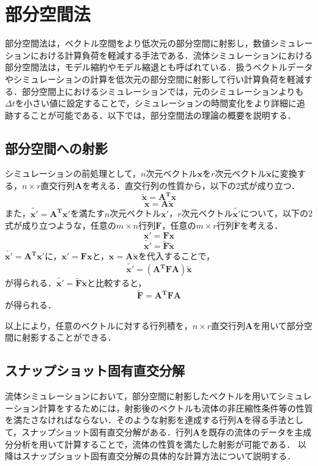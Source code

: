 \documentclass[a4j,12pt]{jreport}
\begin{document}
\section{部分空間法}\label{sec:Subspace}
部分空間法は，ベクトル空間をより低次元の部分空間に射影し，数値シミュレーションにおける計算負荷を軽減する手法である．流体シミュレーションにおける部分空間法は，モデル縮約やモデル縮退とも呼ばれている．扱うベクトルデータやシミュレーションの計算を低次元の部分空間に射影して行い計算負荷を軽減する．部分空間上におけるシミュレーションでは，元のシミュレーションよりも$\varDelta t$を小さい値に設定することで，シミュレーションの時間変化をより詳細に追跡することが可能である．以下では，部分空間法の理論の概要を説明する．

\subsection{部分空間への射影}
シミュレーションの前処理として，$n$次元ベクトル$\bm{x}$を$r$次元ベクトル$\bm{\tilde{x}} $に変換する，$n \times r$直交行列$\bm{A}$を考える．直交行列の性質から，以下の2式が成り立つ．
 	\[
 		\bm{\tilde{x}}  = \bm{A^T}\bm{x}
 	\]
	\[
		\bm{x} = \bm{A}\bm{\tilde{x}} 
	\]	
	また，$\bm{\tilde{x'}}  = \bm{A^T}\bm{x'}$を満たす$n$次元ベクトル$\bm{x'}$，$r$次元ベクトル$\bm{\tilde{x'}} $について，以下の2式が成り立つような，任意の$m \times n$行列$\bm{F}$，任意の$m \times r$行列$\bm{\tilde{F}}$を考える．
	\[
		\bm{x'} = \bm{F}\bm{x}
	\]
	\[
		\bm{\tilde{x'}}  = \bm{\tilde{F}}\bm{\tilde{x}} 
	\]
$\bm{\tilde{x'}}  = \bm{A^T}\bm{x'}$に，$\bm{x'} = \bm{F}\bm{x}$と，$\bm{x} = \bm{A}\bm{\tilde{x}} $を代入することで，
	\[
		\bm{\tilde{x'}}  = (\bm{A^T}\bm{F}\bm{A})\bm{\tilde{x}} 
	\]
	が得られる．$\bm{\tilde{x'}}  = \bm{\tilde{F}}\bm{\tilde{x}} $と比較すると，
	\[
	\bm{\tilde{F}} = \bm{A^T}\bm{F}\bm{A}
	\]
	が得られる．
	
以上により，任意のベクトルに対する行列積を，$n \times r$直交行列$\bm{A}$を用いて部分空間に射影することができる．

\subsection{スナップショット固有直交分解}
流体シミュレーションにおいて，部分空間に射影したベクトルを用いてシミュレーション計算をするためには，射影後のベクトルも流体の非圧縮性条件等の性質を満たさなければならない．そのような射影を達成する行列$\bm{A}$を得る手法として，スナップショット固有直交分解がある．行列$\bm{A}$を既存の流体のデータを主成分分析を用いて計算することで，流体の性質を満たした射影が可能である．
以降はスナップショット固有直交分解の具体的な計算方法について説明する．
	
\end{document}
